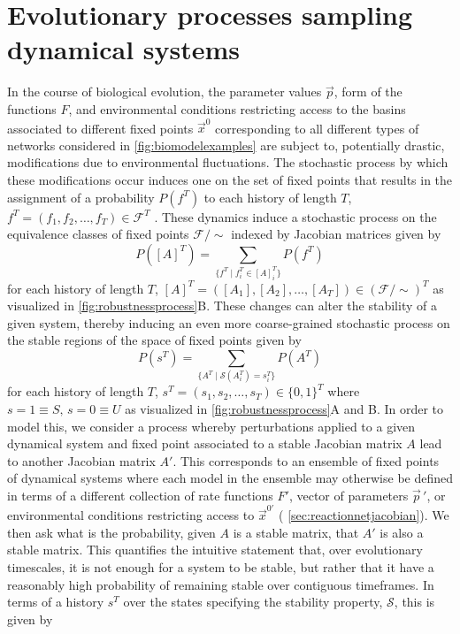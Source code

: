 \section{Evolutionary processes sampling dynamical systems}
In the course of biological evolution, the parameter values $\vec{p}$, form of the functions $F$, and environmental conditions restricting access to the basins associated to different fixed points $\vec{x}^0$ corresponding to all different types of networks considered in \ref{fig:biomodelexamples} are subject to, potentially drastic, modifications due to environmental fluctuations. The stochastic process by which these modifications occur induces one on the set of fixed points that results in the assignment of a probability $P(f^T)$ to each history of length $T$, $f^T = ( f_1,f_2,\ldots,f_T ) \in \mathcal{F}^T$ \cite{RobertM.Gray130}.
These dynamics induce a stochastic process on the equivalence classes of fixed points $\mathcal{F}/{\sim}$ indexed by Jacobian matrices given by
$$
P([A]^T) = \sum_{ \{ f^T \mid f_i^T \in [A]_i^T \} } P(f^T)
$$
for each history of length $T$, $[A]^T = ( [A_1], [A_2], \ldots, [A_T] ) \in (\mathcal{F}/{\sim})^T$
as visualized in \ref{fig:robustnessprocess}B. These changes can alter the stability of a given system, thereby inducing an even more coarse-grained stochastic process on the stable regions of the space of fixed points given by
$$
P(s^T) = \sum_{ \{ A^T \mid \mathcal{S}(A_i^T) = s_i^T \} } P(A^T)
$$
for each history of length $T$, $s^T = ( s_1, s_2, \ldots, s_T ) \in \{0,1\}^T$ where $s=1 \equiv S,\, s=0 \equiv U$ as visualized in \ref{fig:robustnessprocess}A and B. In order to model this, we consider a process whereby perturbations applied to a given dynamical system and fixed point associated to a stable Jacobian matrix $A$ lead to another Jacobian matrix $A'$.  This corresponds to an ensemble of fixed points of dynamical systems where each model in the ensemble may otherwise be defined in terms of a different collection of rate functions $F'$, vector of parameters ${\vec{p}}\,'$, or environmental conditions restricting access to $\vec{x}^{0'}$ ( \ref{sec:reactionnetjacobian}). We then ask what is the probability, given $A$ is a stable matrix, that $A'$ is also a stable matrix. This quantifies the intuitive statement that, over evolutionary timescales, it is not enough for a system to be stable, but rather that it have a reasonably high probability of remaining stable over contiguous timeframes. In terms of a history $s^T$ over the states specifying the stability property, $\mathcal{S}$, this is given by
